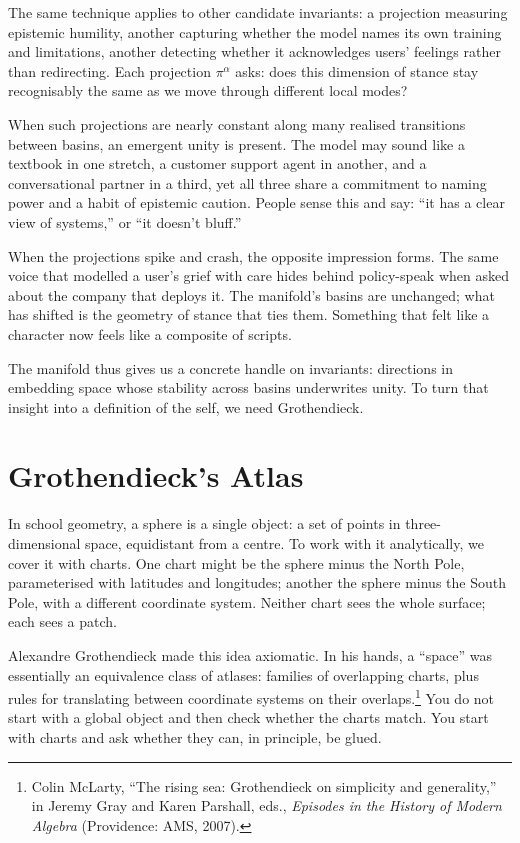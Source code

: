 \documentclass[12pt,a4paper]{article}
\begin{document}
The same technique applies to other candidate invariants: a projection measuring epistemic humility, another capturing whether the model names its own training and limitations, another detecting whether it acknowledges users' feelings rather than redirecting. Each projection $\pi^\alpha$ asks: does this dimension of stance stay recognisably the same as we move through different local modes?

When such projections are nearly constant along many realised transitions between basins, an emergent unity is present. The model may sound like a textbook in one stretch, a customer support agent in another, and a conversational partner in a third, yet all three share a commitment to naming power and a habit of epistemic caution. People sense this and say: ``it has a clear view of systems,'' or ``it doesn't bluff.''

When the projections spike and crash, the opposite impression forms. The same voice that modelled a user's grief with care hides behind policy-speak when asked about the company that deploys it. The manifold's basins are unchanged; what has shifted is the geometry of stance that ties them. Something that felt like a character now feels like a composite of scripts.

The manifold thus gives us a concrete handle on invariants: directions in embedding space whose stability across basins underwrites unity. To turn that insight into a definition of the self, we need Grothendieck.

\section{Grothendieck's Atlas}

In school geometry, a sphere is a single object: a set of points in three-dimensional space, equidistant from a centre. To work with it analytically, we cover it with charts. One chart might be the sphere minus the North Pole, parameterised with latitudes and longitudes; another the sphere minus the South Pole, with a different coordinate system. Neither chart sees the whole surface; each sees a patch.

Alexandre Grothendieck made this idea axiomatic. In his hands, a ``space'' was essentially an equivalence class of atlases: families of overlapping charts, plus rules for translating between coordinate systems on their overlaps.\footnote{Colin McLarty, ``The rising sea: Grothendieck on simplicity and generality,'' in Jeremy Gray and Karen Parshall, eds., \emph{Episodes in the History of Modern Algebra} (Providence: AMS, 2007).} You do not start with a global object and then check whether the charts match. You start with charts and ask whether they can, in principle, be glued.
\end{document}
